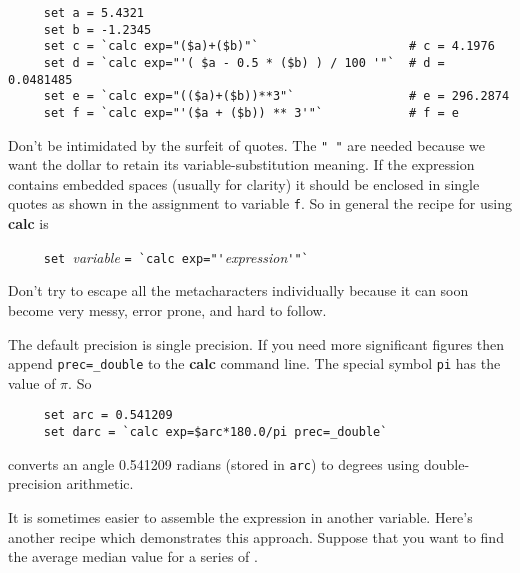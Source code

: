 \small
\begin{verbatim}
     set a = 5.4321
     set b = -1.2345
     set c = `calc exp="($a)+($b)"`                     # c = 4.1976
     set d = `calc exp="'( $a - 0.5 * ($b) ) / 100 '"`  # d = 0.0481485
     set e = `calc exp="(($a)+($b))**3"`                # e = 296.2874
     set f = `calc exp="'($a + ($b)) ** 3'"`            # f = e
\end{verbatim}
\normalsize
Don't be intimidated by the surfeit of quotes.  The {\tt "~"} are needed
because we want the dollar to retain its variable-substitution meaning.
If the expression contains embedded spaces (usually for clarity) it
should be enclosed in single quotes as shown in the assignment to
variable {\tt f}.  So in general the recipe for using {\bf calc} is

\verb#     set #{\em variable} \verb#= `calc exp="'#{\em expression}\verb#'"`#

Don't try to escape all the metacharacters individually because it can
soon become very messy, error prone, and hard to follow.
\medskip

The default precision is single precision.  If you need more
significant figures then append {\tt prec=\_double} to the {\bf calc}
command line.  The special symbol {\tt pi} has the value of $\pi$.  So

\small
\begin{verbatim}
     set arc = 0.541209
     set darc = `calc exp=$arc*180.0/pi prec=_double`
\end{verbatim}
\normalsize
converts an angle 0.541209 radians (stored in {\tt arc}) to degrees
using double-precision arithmetic.

It is sometimes easier to assemble the expression in another variable.
Here's another recipe which demonstrates this approach.  Suppose that you
want to find the average median value for a series of .

